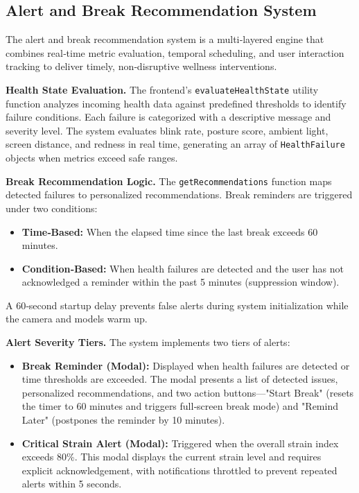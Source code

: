 \documentclass[12pt]{report}
\begin{document}
\subsection{Alert and Break Recommendation System}

The alert and break recommendation system is a multi‑layered engine that combines real‑time metric evaluation, temporal scheduling, and user interaction tracking to deliver timely, non‑disruptive wellness interventions.

\textbf{Health State Evaluation.} The frontend's \texttt{evaluateHealthState} utility function analyzes incoming health data against predefined thresholds to identify failure conditions. Each failure is categorized with a descriptive message and severity level. The system evaluates blink rate, posture score, ambient light, screen distance, and redness in real time, generating an array of \texttt{HealthFailure} objects when metrics exceed safe ranges.

\textbf{Break Recommendation Logic.} The \texttt{getRecommendations} function maps detected failures to personalized recommendations. Break reminders are triggered under two conditions:

\begin{itemize}
    \item \textbf{Time‑Based:} When the elapsed time since the last break exceeds 60 minutes.
    \item \textbf{Condition‑Based:} When health failures are detected and the user has not acknowledged a reminder within the past 5 minutes (suppression window).
\end{itemize}

A 60‑second startup delay prevents false alerts during system initialization while the camera and models warm up.

\textbf{Alert Severity Tiers.} The system implements two tiers of alerts:

\begin{itemize}
    \item \textbf{Break Reminder (Modal):} Displayed when health failures are detected or time thresholds are exceeded. The modal presents a list of detected issues, personalized recommendations, and two action buttons—"Start Break" (resets the timer to 60 minutes and triggers full‑screen break mode) and "Remind Later" (postpones the reminder by 10 minutes).
    \item \textbf{Critical Strain Alert (Modal):} Triggered when the overall strain index exceeds 80\%. This modal displays the current strain level and requires explicit acknowledgement, with notifications throttled to prevent repeated alerts within 5 seconds.
\end{itemize}
\end{document}
